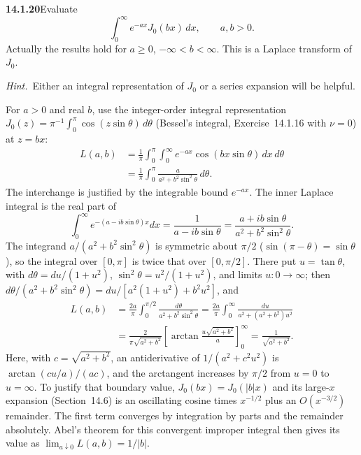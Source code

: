 \par\bigskip
\noindent\textbf{14.1.20}\quad Evaluate
\[
\int_{0}^{\infty}e^{-ax}J_{0}(bx)\,dx,\qquad a,b>0.
\]
Actually the results hold for $a\ge0$, $-\infty<b<\infty$. This is a
Laplace transform of $J_{0}$.
\par\emph{Hint.}~Either an integral representation of $J_{0}$ or a
series expansion will be helpful.
\par{}
\solution
For $a>0$ and real $b$, use the integer-order integral representation
$J_0(z)=\pi^{-1}\int_0^\pi\cos(z\sin\theta)\,d\theta$ (Bessel's
integral, Exercise~14.1.16 with $\nu=0$) at $z=bx$:
\begin{align*}
L(a,b)&=\frac1\pi\int_0^\pi\int_0^\infty
e^{-ax}\cos(bx\sin\theta)\,dx\,d\theta\\
&=\frac1\pi\int_0^\pi\frac{a}{a^2+b^2\sin^2\theta}\,d\theta.
\end{align*}
The interchange is justified by the integrable bound $e^{-ax}$.
The inner Laplace integral is the real part of
\[
\int_0^\infty e^{-(a-ib\sin\theta)x}dx=\frac1{a-ib\sin\theta}
=\frac{a+ib\sin\theta}{a^2+b^2\sin^2\theta}.
\]
The integrand $a/(a^2+b^2\sin^2\theta)$ is symmetric about $\pi/2$
($\sin(\pi-\theta)=\sin\theta$), so the integral over $[0,\pi]$ is
twice that over $[0,\pi/2]$. There put $u=\tan\theta$, with
$d\theta=du/(1+u^2)$, $\sin^2\theta=u^2/(1+u^2)$, and limits
$u:0\to\infty$; then
$d\theta/(a^2+b^2\sin^2\theta)=du/[a^2(1+u^2)+b^2u^2]$, and
\begin{align*}
L(a,b)&=\frac{2a}{\pi}\int_0^{\pi/2}
\frac{d\theta}{a^2+b^2\sin^2\theta}
=\frac{2a}{\pi}\int_0^\infty
\frac{du}{a^2+(a^2+b^2)u^2}\\
&=\frac{2}{\pi\sqrt{a^2+b^2}}
\left[\arctan\frac{u\sqrt{a^2+b^2}}a\right]_0^\infty
=\boxed{\frac1{\sqrt{a^2+b^2}}}.
\end{align*}
Here, with $c=\sqrt{a^2+b^2}$, an antiderivative of
$1/(a^2+c^2u^2)$ is $\arctan(cu/a)/(ac)$, and the arctangent increases
by $\pi/2$ from $u=0$ to $u=\infty$.
To justify that boundary value, $J_0(bx)=J_0(|b|x)$ and its large-$x$
expansion (Section~14.6) is an oscillating cosine times $x^{-1/2}$
plus an $O(x^{-3/2})$ remainder. The first term converges by integration by
parts and the remainder absolutely. Abel's theorem for this
convergent improper integral then gives its value as
$\lim_{a\downarrow0}L(a,b)=1/|b|$.

